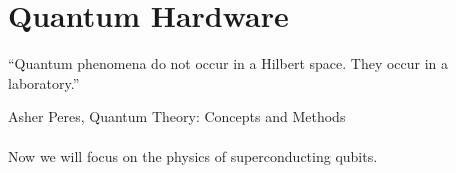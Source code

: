 \section{Quantum Hardware}
\label{Sec: Quantum Hardware}

\epigraph{“Quantum phenomena do not occur in a Hilbert space. They occur in a laboratory.”}{Asher Peres, Quantum Theory: Concepts and Methods}

\paragraph{}Now we will focus on the physics of superconducting qubits.